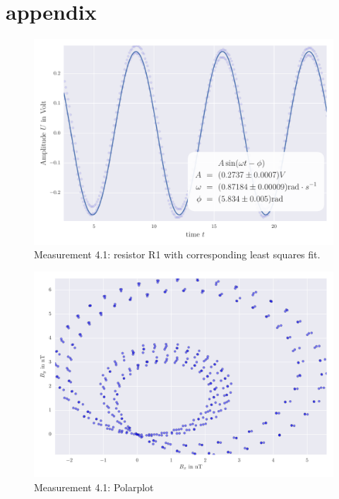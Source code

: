 \section{appendix}
\label{sec:appendix}
\begin{figure}[H]
    \centering
    \includegraphics[width=0.7\linewidth]{analysis/figures/fit4_1}
    \caption{Measurement 4.1: resistor R1 with corresponding least squares fit.}
    \label{fig:4_1_plot}
\end{figure}
\begin{figure}[H]
    \centering
    \includegraphics[width=0.7\linewidth]{analysis/figures/polar4_1}
    \caption{Measurement 4.1: Polarplot}
    \label{fig:4_1_polar}
\end{figure}


